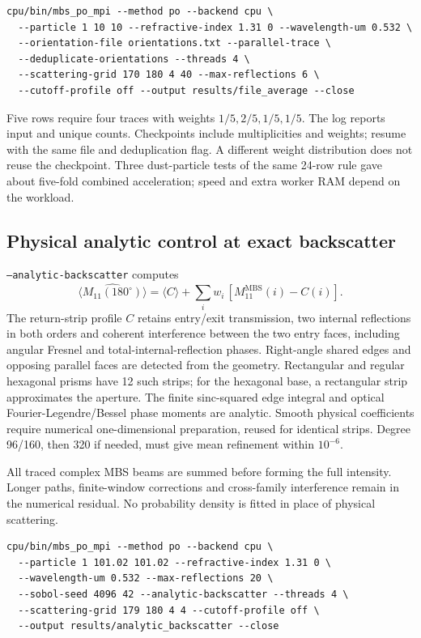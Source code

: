 \documentclass[
  10pt,
  a4paper,
]{article}
\begin{document}
\begin{verbatim}
cpu/bin/mbs_po_mpi --method po --backend cpu \
  --particle 1 10 10 --refractive-index 1.31 0 --wavelength-um 0.532 \
  --orientation-file orientations.txt --parallel-trace \
  --deduplicate-orientations --threads 4 \
  --scattering-grid 170 180 4 40 --max-reflections 6 \
  --cutoff-profile off --output results/file_average --close
\end{verbatim}

Five rows require four traces with weights $1/5,2/5,1/5,1/5$.
The log reports input and unique counts. Checkpoints include multiplicities
and weights; resume with the same file and deduplication flag. A different
weight distribution does not reuse the checkpoint. Three dust-particle tests
of the same 24-row rule gave about five-fold combined acceleration; speed
and extra worker RAM depend on the workload.

\subsection{Physical analytic control at exact backscatter}
\texttt{--analytic-backscatter} computes
\[
 \widehat{\langle M_{11}(180^\circ)\rangle}
 =\langle C\rangle+\sum_i w_i\,[M_{11}^{\mathrm{MBS}}(i)-C(i)].
\]
The return-strip profile $C$ retains entry/exit transmission, two internal
reflections in both orders and coherent interference between the two entry
faces, including angular Fresnel and total-internal-reflection phases.
Right-angle shared edges and opposing parallel faces are detected from the
geometry. Rectangular and regular hexagonal prisms have 12 such strips;
for the hexagonal base, a rectangular strip approximates the aperture.
The finite sinc-squared edge integral and optical Fourier-Legendre/Bessel
phase moments are analytic. Smooth physical coefficients require numerical
one-dimensional preparation, reused for identical strips. Degree 96/160,
then 320 if needed, must give mean refinement within $10^{-6}$.

All traced complex MBS beams are summed before forming the full intensity.
Longer paths, finite-window corrections and cross-family interference remain
in the numerical residual. No probability density is fitted in place of
physical scattering.

\begin{verbatim}
cpu/bin/mbs_po_mpi --method po --backend cpu \
  --particle 1 101.02 101.02 --refractive-index 1.31 0 \
  --wavelength-um 0.532 --max-reflections 20 \
  --sobol-seed 4096 42 --analytic-backscatter --threads 4 \
  --scattering-grid 179 180 4 4 --cutoff-profile off \
  --output results/analytic_backscatter --close
\end{verbatim}
\end{document}
